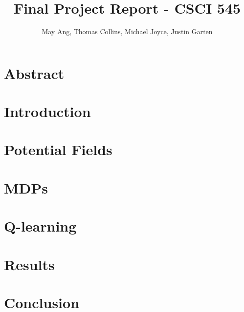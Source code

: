 \documentclass[12pt]{amsart}
\title{Final Project Report - CSCI 545}
\author{May Ang, Thomas Collins, Michael Joyce, Justin Garten}
\begin{document}
\maketitle
\section{Abstract}
\section{Introduction}
\section{Potential Fields} 
\section{MDPs}
\section{Q-learning}
\section{Results}
\section{Conclusion}
\end{document}
